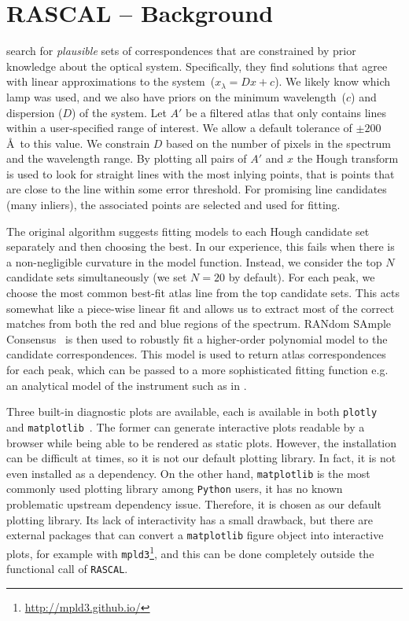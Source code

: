 \documentclass[fleqn,usenatbib]{rasti}
\begin{document}
\section{RASCAL -- Background}
\citet{2018ApOpt..57.6876S} search for \textit{plausible} sets of
correspondences that are constrained by prior knowledge about the optical system.
Specifically, they find solutions that agree with linear approximations to the
system~($x_\lambda = Dx + c$). We likely know which lamp was used, and we also have
priors on the minimum wavelength~($c$) and dispersion ($D$) of the system. Let $A'$ be
a filtered atlas that only contains lines within a user-specified range of interest.
We allow a default tolerance of $\pm 200$ \AA~to this value. We constrain $D$ based on
the number of pixels in the spectrum and the wavelength range. By plotting all pairs of $A'$ and $x$ the Hough transform is used to look for straight lines with the most inlying points, that is points that are close to the line within some error threshold. For promising line candidates (many inliers), the associated points are selected and used for fitting.

The original algorithm suggests fitting models to each Hough candidate set separately
and then choosing the best. In our experience, this fails when there is a non-negligible
curvature in the model function. Instead, we consider the top $N$ candidate sets
simultaneously (we set $N = 20$ by default). For each peak, we choose the most common
best-fit atlas line from the top candidate sets. This acts somewhat like a piece-wise
linear fit and allows us to extract most of the correct matches from both the red and
blue regions of the spectrum. RANdom SAmple
Consensus~\citep[RANSAC][]{fischler_bolles_1981} is then used to robustly fit
a higher-order polynomial model to the candidate correspondences. This model is used
to return atlas correspondences for each peak, which can be passed to a more
sophisticated fitting function e.g. an analytical model of the instrument such as
in \citet{2013OptEn..52a3603L}.

Three built-in diagnostic plots are available, each is available in both
\texttt{plotly}~\citep{plotly} and \texttt{matplotlib}~\citep{Hunter:2007, thomas_a_caswell_2021_4743323}. The former can generate interactive plots
readable by a browser while being able to be rendered as static plots. However,
the installation can be difficult at times, so it is not our default plotting
library. In fact, it is not even installed as a dependency. On the other hand,
\texttt{matplotlib} is the most commonly used plotting library
among \texttt{Python} users, it has no known problematic upstream dependency issue.
Therefore, it is chosen as our default plotting library. Its lack of
interactivity has a small drawback, but there are external packages that can
convert a \texttt{matplotlib} figure object into interactive plots, for example
with \texttt{mpld3}\footnote{\url{http://mpld3.github.io/}}, and this can be done
completely outside the functional call of \texttt{RASCAL}.
\end{document}
